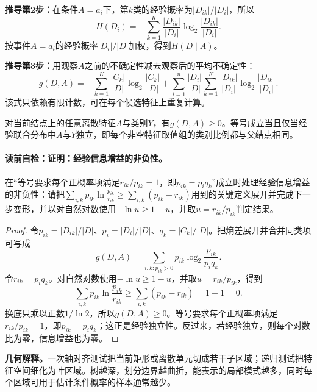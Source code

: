 \textbf{推导第2步：}在条件$A=a_i$下，第$k$类的经验概率为$|D_{ik}|/|D_i|$，所以
\[
H(D_i)=-\sum_{k=1}^{K}\frac{|D_{ik}|}{|D_i|}\log_2\frac{|D_{ik}|}{|D_i|}.
\]
按事件$A=a_i$的经验概率$|D_i|/|D|$加权，得到$H(D\mid A)$。

\textbf{推导第3步：}用观察$A$之前的不确定性减去观察后的平均不确定性：
\[
g(D,A)=-\sum_{k=1}^{K}\frac{|C_k|}{|D|}\log_2\frac{|C_k|}{|D|}
+\sum_{i=1}^{n}\frac{|D_i|}{|D|}
 \sum_{k=1}^{K}\frac{|D_{ik}|}{|D_i|}\log_2\frac{|D_{ik}|}{|D_i|}.
\]
该式只依赖有限计数，可在每个候选特征上重复计算。

\label{struct:V2-C04-CH12}
\begin{theorem}[经验信息增益的非负性]\label{thm:V2-C04-gain-nonnegative}
对当前结点上的任意离散特征$A$与类别$Y$，有$g(D,A)\ge0$。等号成立当且仅当经验联合分布中$A$与$Y$独立，即每个非空特征取值组的类别比例都与父结点相同。
\end{theorem}

\label{struct:V2-C04-CH13}
\paragraph{读前自检：证明：经验信息增益的非负性。}在“等号要求每个正概率项满足$r_{ik}/p_{ik}=1$，即$p_{ik}=p_iq_k$”成立时处理经验信息增益的非负性：请把$\sum_{i,k}p_{ik}\ln\frac{p_{ik}}{r_{ik}} \ge\sum_{i,k}(p_{ik}-r_{ik})$用到的关键定义展开并完成下一步变形，并以对自然对数使用$-\ln u\ge1-u$，并取$u=r_{ik}/p_{ik}$判定结果。\par

\begin{proof}
令$p_{ik}=|D_{ik}|/|D|$、$p_i=|D_i|/|D|$、$q_k=|C_k|/|D|$。把熵差展开并合并同类项可写成
\[
g(D,A)=\sum_{i,k:p_{ik}>0}p_{ik}\log_2\frac{p_{ik}}{p_iq_k}.
\]
令$r_{ik}=p_iq_k$。对自然对数使用$-\ln u\ge1-u$，并取$u=r_{ik}/p_{ik}$，得到
\[
\sum_{i,k}p_{ik}\ln\frac{p_{ik}}{r_{ik}}
\ge\sum_{i,k}(p_{ik}-r_{ik})=1-1=0.
\]
换底只乘以正数$1/\ln2$，所以$g(D,A)\ge0$。等号要求每个正概率项满足$r_{ik}/p_{ik}=1$，即$p_{ik}=p_iq_k$；这正是经验独立性。反过来，若经验独立，则每个对数比为零，信息增益也为零。
\end{proof}

\label{struct:V2-C04-CH14}
\begin{geometrybox}
\textbf{几何解释。}一次轴对齐测试把当前矩形或离散单元切成若干子区域；递归测试把特征空间细化为叶区域。树越深，划分边界越曲折，能表示的局部模式越多，同时每个区域可用于估计条件概率的样本通常越少。
\end{geometrybox}

